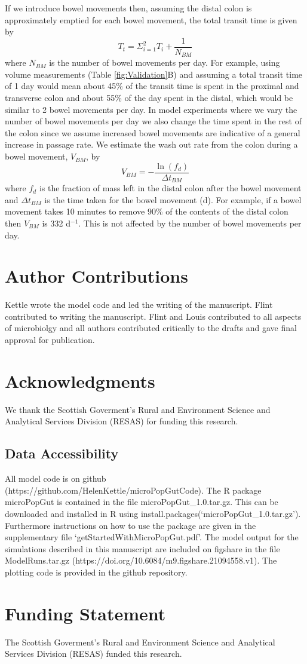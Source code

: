 \documentclass[a4paper]{article}
\begin{document}
If we introduce bowel movements then, assuming the distal colon is approximately emptied for each bowel movement, the total transit time is given by 
\begin{equation}
    T_t=\Sigma_{i=1}^2T_i + \frac{1}{N_{BM}}
\end{equation}
where $N_{BM}$ is the number of bowel movements per day.
For example, using volume measurements (Table \ref{fig:Validation}B) and assuming a total transit time of 1 day would mean about 45\% of the transit time is spent in the proximal and transverse colon and about 55\% of the day spent in the distal, which would be similar to 2 bowel movements per day. 
In model experiments where we vary the number of bowel movements per day we also change the time spent in the rest of the colon since we assume increased bowel movements are indicative of a general increase in passage rate.
We estimate the wash out rate from the colon during a bowel movement, $V_{BM}$, by
\begin{equation}
    V_{BM}=-\frac{\ln(f_d)}{\Delta t_{BM}}
\end{equation}
where $f_d$ is the fraction of mass left in the distal colon after the bowel movement and $\Delta t_{BM}$ is the time taken for the bowel movement (d). For example, if a bowel movement takes 10 minutes to remove 90\% of the contents of the distal colon then $V_{BM}$ is 332  d$^{-1}$. This is not affected by the number of bowel movements per day.

\section*{Author Contributions}
Kettle wrote the model code and led the writing of the manuscript. Flint contributed to writing the manuscript. Flint and Louis contributed to all aspects of microbiolgy and all authors contributed critically to the drafts and gave final approval for publication.

\section*{Acknowledgments}
We thank the Scottish Goverment's Rural and Environment Science and Analytical Services Division (RESAS) for funding this research. 

\subsection*{Data Accessibility}
All model code is on github (https://github.com/HelenKettle/microPopGutCode). The R package microPopGut is contained in the file microPopGut\_1.0.tar.gz. This can be downloaded and installed in R using install.packages(`microPopGut\_1.0.tar.gz'). Furthermore instructions on how to use the package are given in the supplementary file `getStartedWithMicroPopGut.pdf'. The model output for the simulations described in this manuscript are included on figshare in the file ModelRuns.tar.gz (https://doi.org/10.6084/m9.figshare.21094558.v1). The plotting code is provided in the github repository.

\section*{Funding Statement}
The Scottish Goverment's Rural and Environment Science and Analytical Services Division (RESAS) funded this research.


\end{document}
